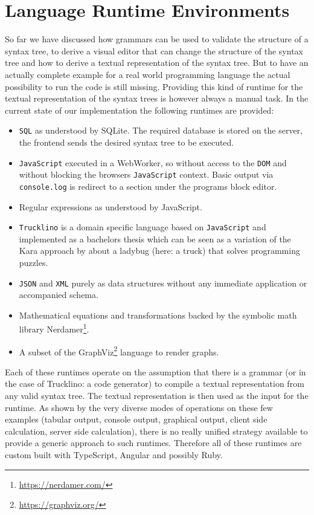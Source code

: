 \documentclass[sigconf,natbib=false]{acmart}
\begin{document}
\section{Language Runtime Environments}
So far we have discussed how grammars can be used to validate the structure of a syntax tree, to derive a visual editor that can change the structure of the syntax tree and how to derive a textual representation of the syntax tree. But to have an actually complete example for a real world programming language the actual possibility to run the code is still missing. Providing this kind of runtime for the textual representation of the syntax trees is however always a manual task. In the current state of our implementation the following runtimes are provided:

\begin{itemize}
\item \texttt{SQL} as understood by SQLite. The required database is stored on the server, the frontend sends the desired syntax tree to be executed.

\item \texttt{JavaScript} executed in a WebWorker, so without access to the \texttt{DOM} and without blocking the browsers \texttt{JavaScript} context. Basic output via \texttt{console.log} is redirect to a section under the programs block editor.

\item Regular expressions as understood by JavaScript.

\item \texttt{Trucklino} is a domain specific language based on \texttt{Java\-Script} and implemented as a bachelors thesis \cite{popp_konzeption_2019} which can be seen as a variation of the Kara approach by \cite{hartmann_kara_2001} about a ladybug (here: a truck) that solves programming puzzles.

\item \texttt{JSON} and \texttt{XML} purely as data structures without any immediate application or accompanied schema.

\item Mathematical equations and transformations backed by the symbolic math library Nerdamer\footnote{\url{https://nerdamer.com/}}.

\item A subset of the GraphViz\footnote{\url{https://graphviz.org/}} language to render graphs.
\end{itemize}

Each of these runtimes operate on the assumption that there is a grammar (or in the case of Trucklino: a code generator) to compile a textual representation from any valid syntax tree. The textual representation is then used as the input for the runtime. As shown by the very diverse modes of operations on these few examples (tabular output, console output, graphical output, client side calculation, server side calculation), there is no really unified strategy available to provide a generic approach to such runtimes. Therefore all of these runtimes are custom built with TypeScript, Angular and possibly Ruby.
\end{document}
